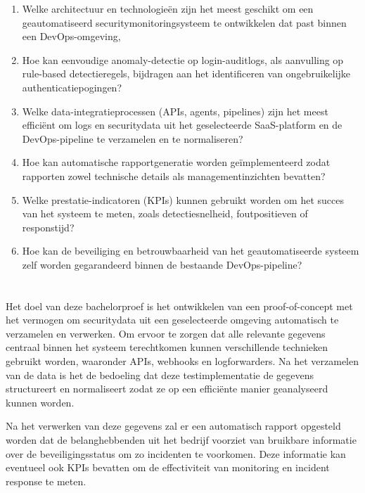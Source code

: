 \begin{enumerate}
    \item Welke architectuur en technologieën zijn het meest geschikt om een geautomatiseerd securitymonitoringsysteem te ontwikkelen dat past binnen een DevOps-omgeving,
    \item Hoe kan eenvoudige anomaly-detectie op login-auditlogs, als aanvulling op rule-based detectieregels, bijdragen aan het identificeren van ongebruikelijke authenticatiepogingen?
    \item Welke data-integratieprocessen (APIs, agents, pipelines) zijn het meest efficiënt om logs en securitydata uit het geselecteerde SaaS-platform en de DevOps-pipeline te verzamelen en te normaliseren?
    \item Hoe kan automatische rapportgeneratie worden geïmplementeerd zodat rapporten zowel technische details als managementinzichten bevatten?
    \item Welke prestatie-indicatoren (KPIs) kunnen gebruikt worden om het succes van het systeem te meten, zoals detectiesnelheid, foutpositieven of responstijd?
    \item Hoe kan de beveiliging en betrouwbaarheid van het geautomatiseerde systeem zelf worden gegarandeerd binnen de bestaande DevOps-pipeline?
\end{enumerate}

\section{}%
\label{sec:onderzoeksdoelstelling}

Het doel van deze bachelorproef is het ontwikkelen van een proof-of-concept met het vermogen om securitydata uit een geselecteerde omgeving automatisch te verzamelen en verwerken. Om ervoor te zorgen dat alle relevante gegevens centraal binnen het systeem terechtkomen kunnen verschillende technieken gebruikt worden, waaronder APIs, webhooks en logforwarders. Na het verzamelen van de data is het de bedoeling dat deze testimplementatie de gegevens structureert en normaliseert zodat ze op een efficiënte manier geanalyseerd kunnen worden.

Na het verwerken van deze gegevens zal er een automatisch rapport opgesteld worden dat de belanghebbenden uit het bedrijf voorziet van bruikbare informatie over de beveiligingsstatus om zo incidenten te voorkomen. Deze informatie kan eventueel ook KPIs bevatten om de effectiviteit van monitoring en incident response te meten.

